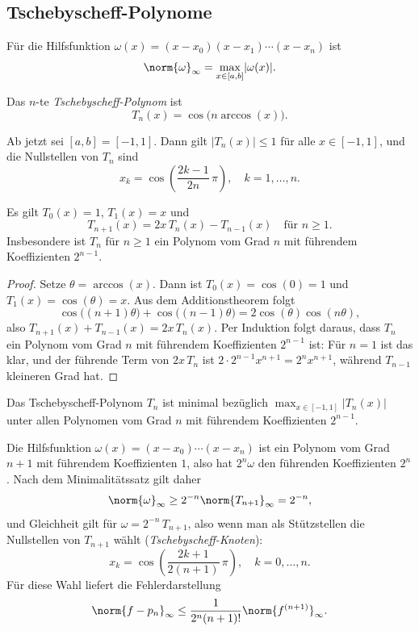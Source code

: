 \documentclass[11pt]{article}
\begin{document}
\subsection{Tschebyscheff-Polynome}

Für die Hilfsfunktion $\omega(x) = (x - x_0)(x - x_1) \dotsm (x - x_n)$ ist
\[ \norm{\omega}_{\infty} = \max_{x \in [a, b]} \lvert \omega(x) \rvert. \]

\begin{definition}[Tschebyscheff]\Theorem
  Das $n$-te \emph{Tschebyscheff-Polynom} ist
  \[ T_n(x) = \cos\bigl(n \arccos(x)\bigr). \]
\end{definition}

Ab jetzt sei $[a, b] = [-1, 1]$. Dann gilt $\lvert T_n(x) \rvert \le 1$ für alle $x \in [-1, 1]$, und die Nullstellen von $T_n$ sind
\[ x_k = \cos\left(\frac{2k-1}{2n}\, \pi\right), \quad k = 1, \dots, n. \]


\begin{ergaenzung}
\begin{lemma}\Theorem
  Es gilt $T_0(x) = 1$, $T_1(x) = x$ und
  \[ T_{n+1}(x) = 2x\, T_n(x) - T_{n-1}(x) \quad \text{für } n \ge 1. \]
  Insbesondere ist $T_n$ für $n \ge 1$ ein Polynom vom Grad $n$ mit führendem Koeffizienten $2^{n-1}$.
\end{lemma}
\begin{proof}
  Setze $\theta = \arccos(x)$. Dann ist $T_0(x) = \cos(0) = 1$ und $T_1(x) = \cos(\theta) = x$.
  Aus dem Additionstheorem folgt
  \[ \cos\bigl((n+1)\theta\bigr) + \cos\bigl((n-1)\theta\bigr) = 2 \cos(\theta) \cos(n\theta), \]
  also $T_{n+1}(x) + T_{n-1}(x) = 2x\, T_n(x)$.
  Per Induktion folgt daraus, dass $T_n$ ein Polynom vom Grad $n$ mit führendem Koeffizienten $2^{n-1}$ ist: Für $n = 1$ ist das klar, und der führende Term von $2x\, T_n$ ist $2 \cdot 2^{n-1} x^{n+1} = 2^n x^{n+1}$, während $T_{n-1}$ kleineren Grad hat.
\end{proof}
\end{ergaenzung}


\begin{theorem}[Minimalität]\Theorem
  Das Tschebyscheff-Polynom $T_n$ ist minimal bezüglich $\max_{x \in [-1,1]} \lvert T_n(x) \rvert$ unter allen Polynomen vom Grad $n$ mit führendem Koeffizienten $2^{n-1}$.
\end{theorem}

\begin{ergaenzung}
\begin{note}\Theorem
  Die Hilfsfunktion $\omega(x) = (x - x_0) \dotsm (x - x_n)$ ist ein Polynom vom Grad $n+1$ mit führendem Koeffizienten $1$, also hat $2^n \omega$ den führenden Koeffizienten $2^n$.
  Nach dem Minimalitätssatz gilt daher
  \[ \norm{\omega}_{\infty} \ge 2^{-n} \norm{T_{n+1}}_{\infty} = 2^{-n}, \]
  und Gleichheit gilt für $\omega = 2^{-n}\, T_{n+1}$, also wenn man als Stützstellen die Nullstellen von $T_{n+1}$ wählt (\emph{Tschebyscheff-Knoten}):
  \[ x_k = \cos\left(\frac{2k+1}{2(n+1)}\, \pi\right), \quad k = 0, \dots, n. \]
  Für diese Wahl liefert die Fehlerdarstellung
  \[ \norm{f - p_n}_{\infty} \le \frac{1}{2^n (n+1)!} \norm{f^{(n+1)}}_{\infty}. \]
\end{note}
\end{ergaenzung}
\end{document}
